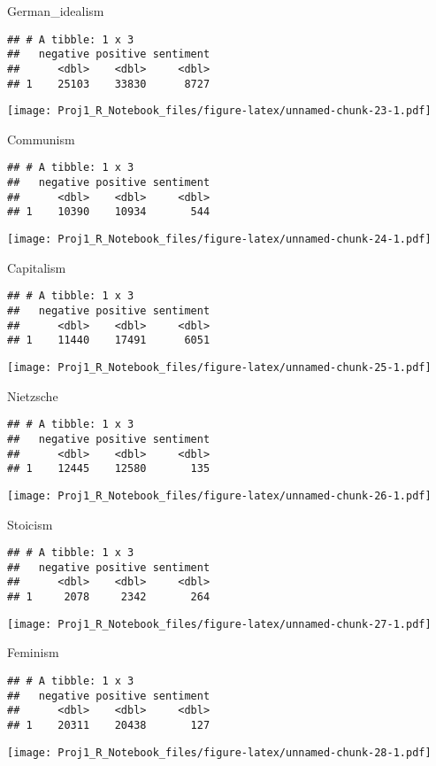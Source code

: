 \documentclass[
]{article}
\begin{document}
German\_idealism

\begin{verbatim}
## # A tibble: 1 x 3
##   negative positive sentiment
##      <dbl>    <dbl>     <dbl>
## 1    25103    33830      8727
\end{verbatim}

\texttt{[image: Proj1\_R\_Notebook\_files/figure-latex/unnamed-chunk-23-1.pdf]}

Communism

\begin{verbatim}
## # A tibble: 1 x 3
##   negative positive sentiment
##      <dbl>    <dbl>     <dbl>
## 1    10390    10934       544
\end{verbatim}

\texttt{[image: Proj1\_R\_Notebook\_files/figure-latex/unnamed-chunk-24-1.pdf]}

Capitalism

\begin{verbatim}
## # A tibble: 1 x 3
##   negative positive sentiment
##      <dbl>    <dbl>     <dbl>
## 1    11440    17491      6051
\end{verbatim}

\texttt{[image: Proj1\_R\_Notebook\_files/figure-latex/unnamed-chunk-25-1.pdf]}

Nietzsche

\begin{verbatim}
## # A tibble: 1 x 3
##   negative positive sentiment
##      <dbl>    <dbl>     <dbl>
## 1    12445    12580       135
\end{verbatim}

\texttt{[image: Proj1\_R\_Notebook\_files/figure-latex/unnamed-chunk-26-1.pdf]}

Stoicism

\begin{verbatim}
## # A tibble: 1 x 3
##   negative positive sentiment
##      <dbl>    <dbl>     <dbl>
## 1     2078     2342       264
\end{verbatim}

\texttt{[image: Proj1\_R\_Notebook\_files/figure-latex/unnamed-chunk-27-1.pdf]}

Feminism

\begin{verbatim}
## # A tibble: 1 x 3
##   negative positive sentiment
##      <dbl>    <dbl>     <dbl>
## 1    20311    20438       127
\end{verbatim}

\texttt{[image: Proj1\_R\_Notebook\_files/figure-latex/unnamed-chunk-28-1.pdf]}
\end{document}
